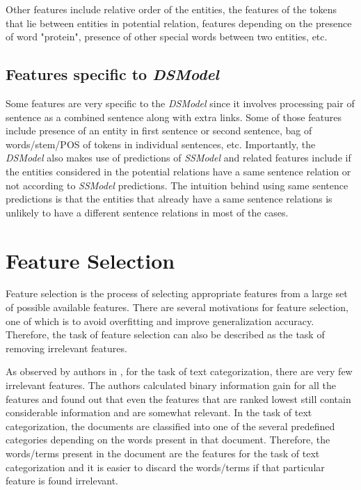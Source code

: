 Other features include relative order of the entities, the features of the tokens that lie between entities in potential relation, features depending on the presence of word "protein", presence of other special words between two entities, etc.

\subsection{Features specific to \textit{DSModel}}

Some features are very specific to the \textit{DSModel} since it involves processing pair of sentence as a combined sentence along with extra links. Some of those features include presence of an entity in first sentence or second sentence, bag of words/stem/POS of tokens in individual sentences, etc. Importantly, the \textit{DSModel} also makes use of predictions of \textit{SSModel} and related features include if the entities considered in the potential relations have a same sentence relation or not according to \textit{SSModel} predictions. The intuition behind using same sentence predictions is that the entities that already have a same sentence relations is unlikely to have a different sentence relations in most of the cases.

\section{Feature Selection}\label{sec:featSel}


Feature selection is the process of selecting appropriate features from a large set of possible available features. There are several motivations for feature selection, one of which is to avoid overfitting and improve generalization accuracy. Therefore, the task of feature selection can also be described as the task of removing irrelevant features.

%
%
%

As observed by authors in \cite{joachims1998text}, for the task of text categorization, there are very few irrelevant features. The authors calculated binary information gain for all the features and found out that even the features that are ranked lowest still contain considerable information and are somewhat relevant. In the task of text categorization, the documents are classified into one of the several predefined categories depending on the words present in that document. Therefore, the words/terms present in the document are the features for the task of text categorization and it is easier to discard the words/terms if that particular feature is found irrelevant. 

